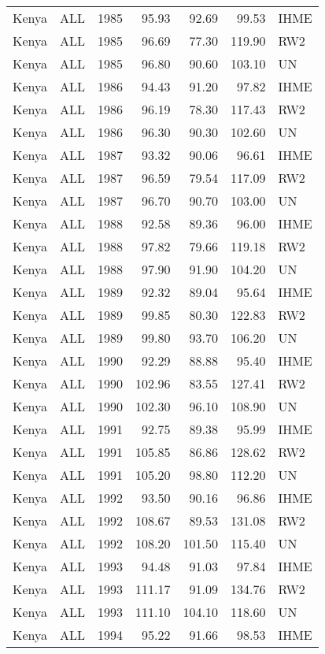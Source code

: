 \begin{longtable}{lllrrrl}
  Kenya & ALL & 1985 & 95.93 & 92.69 & 99.53 & IHME \\ 
  Kenya & ALL & 1985 & 96.69 & 77.30 & 119.90 & RW2 \\ 
  Kenya & ALL & 1985 & 96.80 & 90.60 & 103.10 & UN \\ 
  Kenya & ALL & 1986 & 94.43 & 91.20 & 97.82 & IHME \\ 
  Kenya & ALL & 1986 & 96.19 & 78.30 & 117.43 & RW2 \\ 
  Kenya & ALL & 1986 & 96.30 & 90.30 & 102.60 & UN \\ 
  Kenya & ALL & 1987 & 93.32 & 90.06 & 96.61 & IHME \\ 
  Kenya & ALL & 1987 & 96.59 & 79.54 & 117.09 & RW2 \\ 
  Kenya & ALL & 1987 & 96.70 & 90.70 & 103.00 & UN \\ 
  Kenya & ALL & 1988 & 92.58 & 89.36 & 96.00 & IHME \\ 
  Kenya & ALL & 1988 & 97.82 & 79.66 & 119.18 & RW2 \\ 
  Kenya & ALL & 1988 & 97.90 & 91.90 & 104.20 & UN \\ 
  Kenya & ALL & 1989 & 92.32 & 89.04 & 95.64 & IHME \\ 
  Kenya & ALL & 1989 & 99.85 & 80.30 & 122.83 & RW2 \\ 
  Kenya & ALL & 1989 & 99.80 & 93.70 & 106.20 & UN \\ 
  Kenya & ALL & 1990 & 92.29 & 88.88 & 95.40 & IHME \\ 
  Kenya & ALL & 1990 & 102.96 & 83.55 & 127.41 & RW2 \\ 
  Kenya & ALL & 1990 & 102.30 & 96.10 & 108.90 & UN \\ 
  Kenya & ALL & 1991 & 92.75 & 89.38 & 95.99 & IHME \\ 
  Kenya & ALL & 1991 & 105.85 & 86.86 & 128.62 & RW2 \\ 
  Kenya & ALL & 1991 & 105.20 & 98.80 & 112.20 & UN \\ 
  Kenya & ALL & 1992 & 93.50 & 90.16 & 96.86 & IHME \\ 
  Kenya & ALL & 1992 & 108.67 & 89.53 & 131.08 & RW2 \\ 
  Kenya & ALL & 1992 & 108.20 & 101.50 & 115.40 & UN \\ 
  Kenya & ALL & 1993 & 94.48 & 91.03 & 97.84 & IHME \\ 
  Kenya & ALL & 1993 & 111.17 & 91.09 & 134.76 & RW2 \\ 
  Kenya & ALL & 1993 & 111.10 & 104.10 & 118.60 & UN \\ 
  Kenya & ALL & 1994 & 95.22 & 91.66 & 98.53 & IHME \\ 

\end{longtable}
